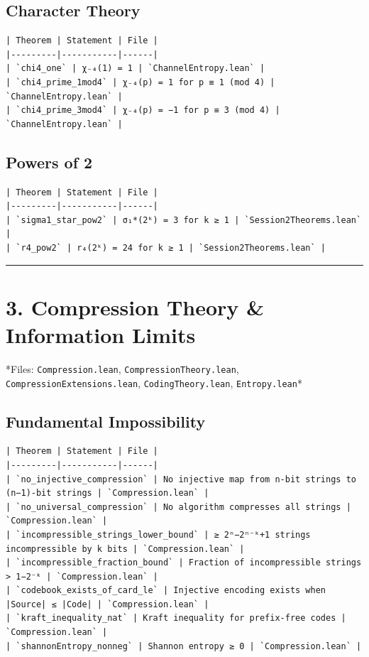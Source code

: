 \documentclass[12pt,a4paper,openany]{book}
\begin{document}
\subsection{Character Theory}
\begin{verbatim}
| Theorem | Statement | File |
|---------|-----------|------|
| `chi4_one` | χ₋₄(1) = 1 | `ChannelEntropy.lean` |
| `chi4_prime_1mod4` | χ₋₄(p) = 1 for p ≡ 1 (mod 4) | `ChannelEntropy.lean` |
| `chi4_prime_3mod4` | χ₋₄(p) = −1 for p ≡ 3 (mod 4) | `ChannelEntropy.lean` |
\end{verbatim}

\subsection{Powers of 2}
\begin{verbatim}
| Theorem | Statement | File |
|---------|-----------|------|
| `sigma1_star_pow2` | σ₁*(2ᵏ) = 3 for k ≥ 1 | `Session2Theorems.lean` |
| `r4_pow2` | r₄(2ᵏ) = 24 for k ≥ 1 | `Session2Theorems.lean` |
\end{verbatim}

\bigskip\hrule\bigskip

\section{3. Compression Theory \& Information Limits}

*Files: \texttt{Compression.lean}, \texttt{CompressionTheory.lean}, \texttt{CompressionExtensions.lean}, \texttt{CodingTheory.lean}, \texttt{Entropy.lean}*

\subsection{Fundamental Impossibility}
\begin{verbatim}
| Theorem | Statement | File |
|---------|-----------|------|
| `no_injective_compression` | No injective map from n-bit strings to (n−1)-bit strings | `Compression.lean` |
| `no_universal_compression` | No algorithm compresses all strings | `Compression.lean` |
| `incompressible_strings_lower_bound` | ≥ 2ⁿ−2ⁿ⁻ᵏ+1 strings incompressible by k bits | `Compression.lean` |
| `incompressible_fraction_bound` | Fraction of incompressible strings > 1−2⁻ᵏ | `Compression.lean` |
| `codebook_exists_of_card_le` | Injective encoding exists when |Source| ≤ |Code| | `Compression.lean` |
| `kraft_inequality_nat` | Kraft inequality for prefix-free codes | `Compression.lean` |
| `shannonEntropy_nonneg` | Shannon entropy ≥ 0 | `Compression.lean` |
\end{verbatim}
\end{document}
